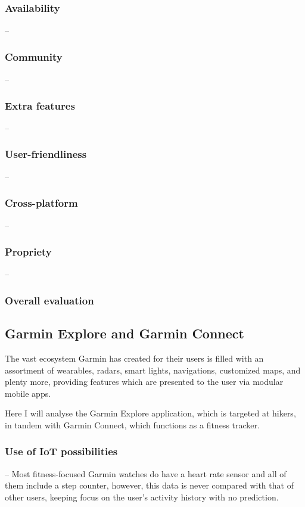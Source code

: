 \subsubsection*{Availability} --
\subsubsection*{Community} -- 
\subsubsection*{Extra features} -- 
\subsubsection*{User-friendliness} -- 
\subsubsection*{Cross-platform} -- 
\subsubsection*{Propriety} -- 
\subsubsection*{Overall evaluation}

\subsection{Garmin Explore and Garmin Connect}
The vast ecosystem Garmin has created for their users is filled with an assortment of wearables, radars, smart lights, navigations, customized maps, and plenty more, providing features which are presented to the user via modular mobile apps.

Here I will analyse the Garmin Explore application, which is targeted at hikers, in tandem with Garmin Connect, which functions as a fitness tracker.

\subsubsection*{Use of IoT possibilities} -- Most fitness-focused Garmin watches do have a heart rate sensor and all of them include a step counter, however, this data is never compared with that of other users, keeping focus on the user's activity history with no prediction.
